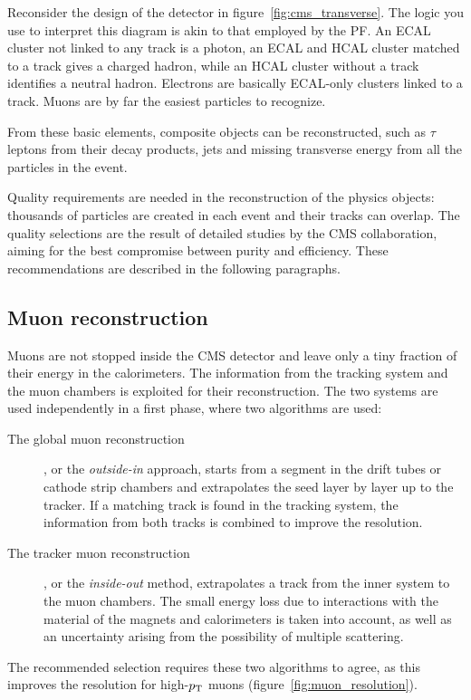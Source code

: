 Reconsider the design of the detector in figure~\ref{fig:cms_transverse}. The logic you use to
interpret this diagram is akin to that employed by the PF.
An ECAL cluster not linked to any track is a photon, an ECAL and HCAL cluster matched to a track gives a charged hadron, while an HCAL cluster without a track identifies a neutral hadron. Electrons are basically ECAL-only clusters linked to a track. Muons are by far the easiest particles to recognize.

From these basic elements, composite objects can be reconstructed, such as
$\tau$ leptons from their decay products, jets and
missing transverse energy from all the particles in the event.

Quality requirements are needed in the reconstruction of the physics
objects: thousands of particles are created in each event and their tracks
can overlap.
The quality selections are the result of detailed studies by the CMS
collaboration, aiming for the best compromise between purity and efficiency.
These recommendations are described in the following paragraphs.

\subsection{Muon reconstruction}
Muons are not stopped inside the CMS detector and leave only a tiny fraction
of their energy in the calorimeters. The information from the tracking
system and the muon chambers is exploited for their reconstruction.
The two systems are used independently in a first phase, where two
algorithms are used:
\begin{description}
    \item[The global muon reconstruction], or the \emph{outside-in}
        approach, starts from a segment in the drift tubes or cathode strip
        chambers and extrapolates the seed layer by layer up to the
        tracker. If a matching track is found in the tracking system, the
        information from both tracks is combined to improve the resolution.
    \item[The tracker muon reconstruction], or the \emph{inside-out} method,
        extrapolates a track from the inner system to the muon chambers. The
        small energy loss due to interactions with the material of the
        magnets and calorimeters is taken into account, as well as an
        uncertainty arising from the possibility of multiple scattering.
\end{description}
The recommended selection requires these two algorithms to agree, as this
improves the resolution for high-$p_\mathrm{T}$ muons
(figure~\ref{fig:muon_resolution}).

